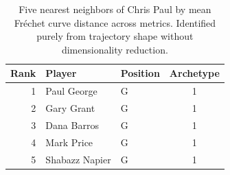 \begin{table}[htbp]
  \centering\small
  \begin{tabular}{rllc}
    \toprule
    Rank & Player & Position & Archetype \\
    \midrule
    1 & Paul George & G & 1 \\
    2 & Gary Grant & G & 1 \\
    3 & Dana Barros & G & 1 \\
    4 & Mark Price & G & 1 \\
    5 & Shabazz Napier & G & 1 \\
    \bottomrule
  \end{tabular}
  \caption{Five nearest neighbors of Chris Paul by mean Fr\'{e}chet curve distance across metrics. Identified purely from trajectory shape without dimensionality reduction.}
  \label{tab:Chris_Paul_frechet_curve_neighbors}
\end{table}

